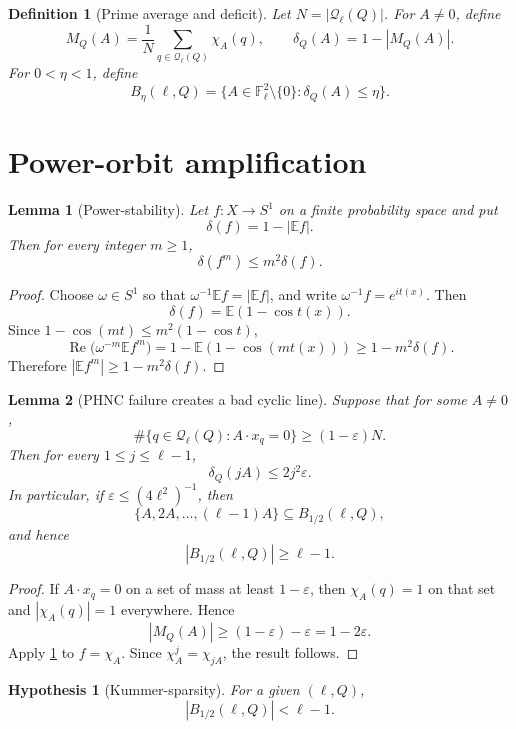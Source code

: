 \documentclass[11pt]{article}
\newtheorem{lemma}{Lemma}
\newtheorem{definition}{Definition}
\newtheorem{hypothesis}{Hypothesis}
\newcommand{\F}{\mathbb F}
\newcommand{\E}{\mathbb E}
\newcommand{\1}{\mathbf 1}
\begin{document}
\begin{definition}[Prime average and deficit]
Let \(N=|\mathcal Q_\ell(Q)|\).  For \(A\ne0\), define
\[
M_Q(A)=\frac1N\sum_{q\in\mathcal Q_\ell(Q)}\chi_A(q),
\qquad
\delta_Q(A)=1-|M_Q(A)|.
\]
For \(0<\eta<1\), define
\[
B_\eta(\ell,Q)=\{A\in\F_\ell^2\setminus\{0\}:\delta_Q(A)\le\eta\}.
\]
\end{definition}

\section{Power-orbit amplification}

\begin{lemma}[Power-stability]\label{L:power}
Let \(f:X\to S^1\) on a finite probability space and put
\[
\delta(f)=1-|\E f|.
\]
Then for every integer \(m\ge1\),
\[
\delta(f^m)\le m^2\delta(f).
\]
\end{lemma}

\begin{proof}
Choose \(\omega\in S^1\) so that \(\omega^{-1}\E f=|\E f|\), and write \(\omega^{-1}f=e^{it(x)}\).  Then
\[
\delta(f)=\E(1-\cos t(x)).
\]
Since \(1-\cos(mt)\le m^2(1-\cos t)\),
\[
\operatorname{Re}\bigl(\omega^{-m}\E f^m\bigr)
=1-\E(1-\cos(mt(x)))
\ge1-m^2\delta(f).
\]
Therefore \(|\E f^m|\ge1-m^2\delta(f)\).
\end{proof}

\begin{lemma}[PHNC failure creates a bad cyclic line]\label{L:orbit}
Suppose that for some \(A\ne0\),
\[
\#\{q\in\mathcal Q_\ell(Q):A\cdot x_q=0\}\ge(1-\varepsilon)N.
\]
Then for every \(1\le j\le\ell-1\),
\[
\delta_Q(jA)\le 2j^2\varepsilon.
\]
In particular, if \(\varepsilon\le(4\ell^2)^{-1}\), then
\[
\{A,2A,\ldots,(\ell-1)A\}\subseteq B_{1/2}(\ell,Q),
\]
and hence
\[
|B_{1/2}(\ell,Q)|\ge\ell-1.
\]
\end{lemma}

\begin{proof}
If \(A\cdot x_q=0\) on a set of mass at least \(1-\varepsilon\), then \(\chi_A(q)=1\) on that set and \(|\chi_A(q)|=1\) everywhere.  Hence
\[
|M_Q(A)|\ge (1-\varepsilon)-\varepsilon=1-2\varepsilon.
\]
Apply \cref{L:power} to \(f=\chi_A\).  Since \(\chi_A^j=\chi_{jA}\), the result follows.
\end{proof}

\begin{hypothesis}[Kummer-sparsity]\label{H:sparsity}
For a given \((\ell,Q)\),
\[
|B_{1/2}(\ell,Q)|<\ell-1.
\]
\end{hypothesis}
\end{document}
